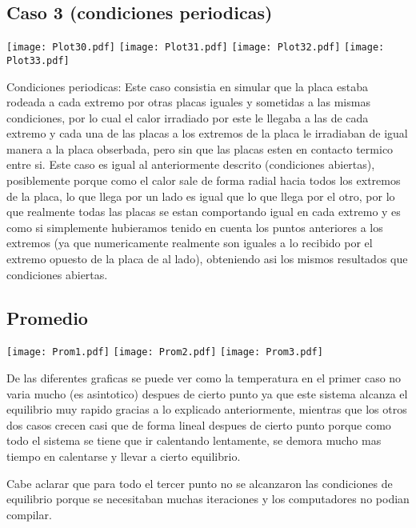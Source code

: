 \documentclass[a4paper,11pt]{article}
\begin{document}
\subsection{Caso 3 (condiciones periodicas)}

\texttt{[image: Plot30.pdf]}
\texttt{[image: Plot31.pdf]}
\texttt{[image: Plot32.pdf]}
\texttt{[image: Plot33.pdf]}

Condiciones periodicas: Este caso consistia en simular que la placa estaba rodeada a cada extremo por otras placas iguales y sometidas a las mismas condiciones, por lo cual el calor irradiado por este le llegaba a las de cada extremo y cada una de las placas a los extremos de la placa le irradiaban de igual manera a la placa obserbada, pero sin que las placas esten en contacto termico entre si. Este caso es igual al anteriormente descrito (condiciones abiertas), posiblemente porque como el calor sale de forma radial hacia todos los extremos de la placa, lo que llega por un lado es igual que lo que llega por el otro, por lo que realmente todas las placas se estan comportando igual en cada extremo y es como si simplemente hubieramos tenido en cuenta los puntos anteriores a los extremos (ya que numericamente realmente son iguales a lo recibido por el extremo opuesto de la placa de al lado), obteniendo asi los mismos resultados que condiciones abiertas.

\subsection{Promedio}

\texttt{[image: Prom1.pdf]}
\texttt{[image: Prom2.pdf]}
\texttt{[image: Prom3.pdf]}

De las diferentes graficas se puede ver como la temperatura en el primer caso no varia mucho (es asintotico) despues de cierto punto ya que este sistema alcanza el equilibrio muy rapido gracias a lo explicado anteriormente, mientras que los otros dos casos crecen casi que de forma lineal despues de cierto punto porque como todo el sistema se tiene que ir calentando lentamente, se demora mucho mas tiempo en calentarse y llevar a cierto equilibrio.

Cabe aclarar que para todo el tercer punto no se alcanzaron las condiciones de equilibrio porque se necesitaban muchas iteraciones y los computadores no podian compilar.
\end{document}
